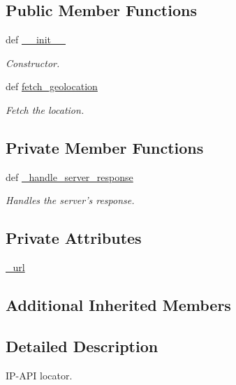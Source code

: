 \subsection*{Public Member Functions}
\begin{DoxyCompactItemize}
\item 
def \hyperlink{classrapp__geolocator_1_1ip__api__locator_1_1IpAPILocator_a439991c125014fd101ef615374edf1e3}{\-\_\-\-\_\-init\-\_\-\-\_\-}
\begin{DoxyCompactList}\small\item\em Constructor. \end{DoxyCompactList}\item 
def \hyperlink{classrapp__geolocator_1_1ip__api__locator_1_1IpAPILocator_a32f6e5bb3b1a2353df808d9a4d28601a}{fetch\-\_\-geolocation}
\begin{DoxyCompactList}\small\item\em Fetch the location. \end{DoxyCompactList}\end{DoxyCompactItemize}
\subsection*{Private Member Functions}
\begin{DoxyCompactItemize}
\item 
def \hyperlink{classrapp__geolocator_1_1ip__api__locator_1_1IpAPILocator_a999efb78fca06de6c6116df62236893a}{\-\_\-handle\-\_\-server\-\_\-response}
\begin{DoxyCompactList}\small\item\em Handles the server's response. \end{DoxyCompactList}\end{DoxyCompactItemize}
\subsection*{Private Attributes}
\begin{DoxyCompactItemize}
\item 
\hyperlink{classrapp__geolocator_1_1ip__api__locator_1_1IpAPILocator_a6637b729fbd6ad872b140adf91c649bc}{\-\_\-url}
\end{DoxyCompactItemize}
\subsection*{Additional Inherited Members}


\subsection{Detailed Description}
I\-P-\/\-A\-P\-I locator. 

